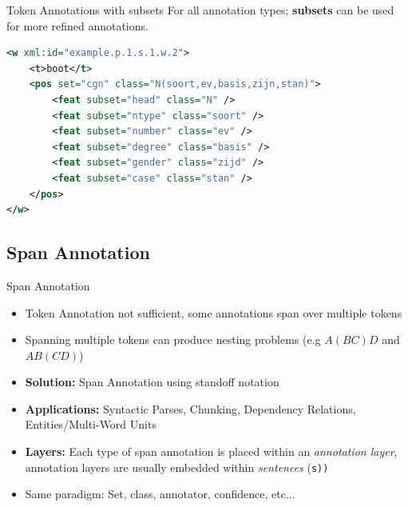 \documentclass[compress,10pt]{beamer}
\begin{document}
\begin{frame}[fragile]

	\begin{block}{Token Annotations with subsets}
		For all annotation types; \textbf{subsets} can be used for more refined annotations.  
	\end{block}
	
	\begin{example}
\begin{lstlisting}[language=xml]
<w xml:id="example.p.1.s.1.w.2">
    <t>boot</t>
    <pos set="cgn" class="N(soort,ev,basis,zijn,stan)">
    	<feat subset="head" class="N" />
        <feat subset="ntype" class="soort" />
        <feat subset="number" class="ev" />
        <feat subset="degree" class="basis" />
        <feat subset="gender" class="zijd" />
        <feat subset="case" class="stan" />
    </pos>
</w>
\end{lstlisting}   
	\end{example} 

\end{frame}



\subsection{Span Annotation}
        
\begin{frame}
    \begin{block}{Span Annotation}
        \begin{itemize}
            \item Token Annotation not sufficient, some annotations span over multiple tokens
            \item Spanning multiple tokens can produce nesting problems (e.g $A (B C) D$ and $A B (C D)$)                
            \item \textbf{Solution:} Span Annotation using standoff notation
            \item \textbf{Applications:} Syntactic Parses, Chunking, Dependency Relations, Entities/Multi-Word Units
            \item \textbf{Layers:} Each type of span annotation is placed within an \emph{annotation layer}, annotation layers are usually embedded within \emph{sentences} (\texttt{s))}
            \item Same paradigm: Set, class, annotator, confidence, etc...
        \end{itemize}        
    \end{block}
\end{frame}
\end{document}
